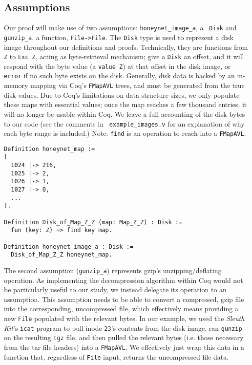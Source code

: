 \documentclass[nocopyrightspace]{sigplanconf}
\begin{document}
\subsection{Assumptions}
Our proof will make use of two assumptions: {\tt honeynet\_image\_a}, a {\tt
Disk} and {\tt gunzip\_a}, a function, {\tt File->File}. The {\tt Disk} type
is used to represent a disk image throughout our definitions and proofs.
Technically, they are functions from {\tt Z} to {\tt Exc Z}, acting as
byte-retrieval mechanism; give a {\tt Disk} an offset, and it will respond
with the byte value (a {\tt value Z}) at that offset in the disk image, or
{\tt error} if no such byte exists on the disk. Generally, disk data is backed
by an in-memory mapping via Coq's {\tt FMapAVL} trees, and must be generated
from the true disk values. Due to Coq's limitations on data structure sizes,
we only populate these maps with essential values; once the map reaches a few
thousand entries, it will no longer be usable within Coq. We leave a full
accounting of the disk bytes to our code (see the comments in {\tt
example\_images.v} for an explanation of why each byte range is included.)
Note: {\tt find} is an operation to reach into a {\tt FMapAVL}.

\begin{lstlisting}
Definition honeynet_map := 
[ 
  1024 |-> 216, 
  1025 |-> 2,
  1026 |-> 1, 
  1027 |-> 0, 
  ...
].

Definition Disk_of_Map_Z_Z (map: Map_Z_Z) : Disk :=
  fun (key: Z) => find key map.

Definition honeynet_image_a : Disk := 
  Disk_of_Map_Z_Z honeynet_map.
\end{lstlisting}

The second assumption ({\tt gunzip\_a}) represents gzip's unzipping/deflating
operation. As implementing the decompression algorithm within Coq would not be
particularly useful to our study, we instead delegate its operation to an
assumption. This assumption needs to be able to convert a compressed, gzip
file into the corresponding, uncompressed file, which effectively means
providing a new {\tt File} populated with the relevant bytes. In our example,
we used the {\it Sleuth Kit}'s {\tt icat} program to pull inode {\tt 23}'s
contents from the disk image, ran {\tt gunzip} on the resulting {\tt tgz}
file, and then pulled the relevant bytes (i.e. those necessary from the tar
file headers) into a {\tt FMapAVL}. We effectively just wrap this data in a
function that, regardless of {\tt File} input, returns the uncompressed file
data. 
\end{document}
